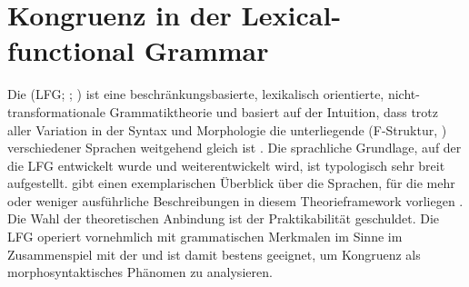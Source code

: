 

\section{Kongruenz in der Lexical-functional Grammar}
\label{sec:lfgkongr}

Die  (LFG;
\cites{kaplanbresnan1982,bresnan2001,bresnanetal2016}; \cites[zur Einführung
z.\,B.][]{buttking2015}[223--246]{mueller2023}) ist eine
beschränkungsbasierte, lexikalisch orientierte,
nicht-trans\allowbreak{}formationale Grammatiktheorie und basiert auf der
Intuition, dass trotz aller Variation in der Syntax und Morphologie die
unterliegende  (F-Struktur,
) verschiedener Sprachen weitgehend gleich ist
\autocite[42]{bresnanetal2016}.
Die sprachliche Grundlage, auf der die LFG entwickelt wurde und
weiterentwickelt wird, ist typologisch sehr breit aufgestellt.
\citet[223--224]{mueller2023} gibt einen exemplarischen Überblick über die
Sprachen, für die mehr oder weniger ausführliche Beschreibungen in diesem
Theorieframework vorliegen \autocites[zum modernen Standarddeutschen
vgl.][]{berman2003}{fortmann2006}. Die Wahl der theoretischen Anbindung ist der
Praktikabilität geschuldet. Die LFG operiert vornehmlich mit grammatischen
Merkmalen im Sinne  im
Zusammenspiel mit der  und ist damit bestens
geeignet, um Kongruenz als morphosyntaktisches Phänomen zu analysieren.

